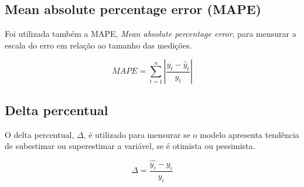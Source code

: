 \subsection{Mean absolute percentage error (MAPE)}

    Foi utilizada também a MAPE, \textit{Mean absolute
    percentage error}, para mensurar a escala do erro em 
    relação ao tamanho das medições.

    \begin{equation}
        MAPE=\sum_{t=1}^n\left|\frac{y_t-\hat{y}_t}{y_t}\right|
    \end{equation}

\subsection{Delta percentual}

O delta percentual, $\Delta$, é utilizado para mensurar se o 
modelo apresenta tendência de subestimar ou superestimar a variável, se 
é otimista ou pessimista.

\begin{equation}
    \Delta = \frac{\hat{y_i} - y_i}{y_i}
\end{equation}
